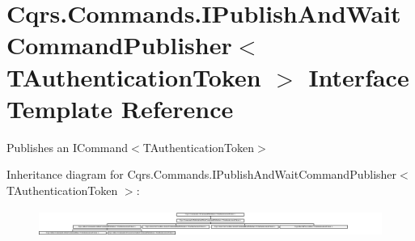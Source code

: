 \hypertarget{interfaceCqrs_1_1Commands_1_1IPublishAndWaitCommandPublisher}{}\section{Cqrs.\+Commands.\+I\+Publish\+And\+Wait\+Command\+Publisher$<$ T\+Authentication\+Token $>$ Interface Template Reference}
\label{interfaceCqrs_1_1Commands_1_1IPublishAndWaitCommandPublisher}


Publishes an I\+Command$<$\+T\+Authentication\+Token$>$  


Inheritance diagram for Cqrs.\+Commands.\+I\+Publish\+And\+Wait\+Command\+Publisher$<$ T\+Authentication\+Token $>$\+:\begin{figure}[H]
\begin{center}
\leavevmode
\includegraphics[height=0.905051cm]{interfaceCqrs_1_1Commands_1_1IPublishAndWaitCommandPublisher}
\end{center}
\end{figure}
